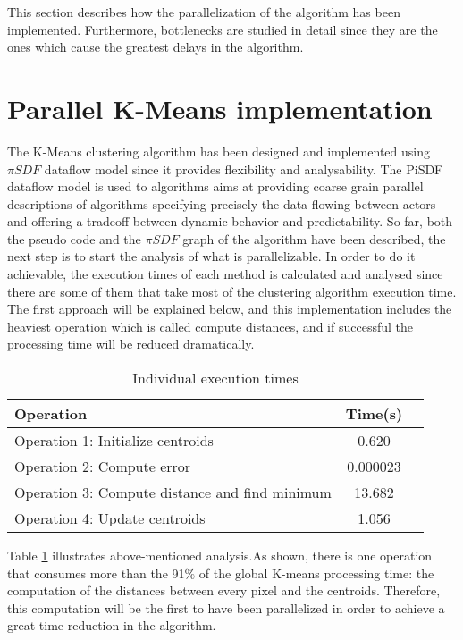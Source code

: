 This section describes how the parallelization of the algorithm has been implemented. Furthermore, bottlenecks are studied in detail since they are the ones which cause the greatest delays in the algorithm.

    \section{Parallel K-Means implementation}
    
  The K-Means clustering algorithm has been designed and implemented using $\pi SDF$ dataflow model since it provides flexibility and analysability. The PiSDF dataflow model is used to  algorithms
aims at providing coarse grain parallel descriptions of algorithms specifying precisely the data flowing between actors
and offering a tradeoff between dynamic behavior and predictability.
   So far, both the pseudo code and the $\pi SDF$ graph of the algorithm have been described, the next step is to start the analysis of what is parallelizable. In order to do it achievable, the execution times of each method is calculated and analysed since there are some of them that take most of the clustering algorithm execution time. The first approach will be explained below, and this implementation includes the heaviest operation  which is called compute distances, and if successful the processing time will be reduced dramatically.
  
   \begin{table}[h!]
  \begin{center}
    \begin{tabular}{l|c|r}
      \textbf{Operation} & \textbf{Time(s)}\\
      \hline 
      Operation 1: Initialize centroids & 0.620\\
      Operation 2: Compute error & 0.000023\\
      Operation 3: Compute distance and find minimum & 13.682\\
      Operation 4: Update centroids & 1.056\\
    \end{tabular}
\caption{Individual execution times}
  \end{center}
\label{tab:template}
\end{table}


Table \ref{tab:template} illustrates above-mentioned analysis.As shown, there is one operation that consumes more than the 91$\%$ of the global K-means processing time: the computation of the distances between every pixel and the centroids. Therefore, this computation will be the first to have been parallelized in order to achieve a great time reduction in the algorithm.

